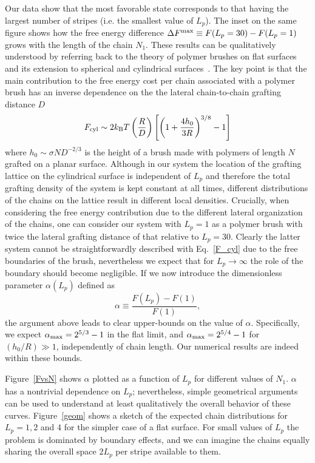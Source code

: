  Our data show that the most favorable state corresponds to that having the largest number of stripes (i.e. the smallest value of $L_p$). The inset on the same figure shows how the free energy difference $\Delta F^{\rm max}\equiv F(L_p=30)-F(L_p=1)$ grows with the length of the chain $N_1$.
 These results can be qualitatively understood by referring back to the theory of polymer brushes on flat surfaces and its extension to spherical and cylindrical  
surfaces~\cite{Cotton,LipowskyPB}. The key point is that the main contribution to the free energy cost per chain associated with a polymer brush has an inverse dependence on the the lateral chain-to-chain grafting distance $D$ 
\begin{equation}
F_{\rm cyl}\sim 2 k_{\rm B}T \left (\frac{R}{D}\right )\left [\left (1+\frac{4h_0}{3R}\right )^{3/8}-1\right ]
\label{F_cyl}
\end{equation} 
where $h_0\sim \sigma N D^{-2/3}$ is the height of a brush made with polymers of length $N$ grafted on a planar surface. Although in our system the location of the grafting lattice on the cylindrical surface 
is independent of $L_p$ and  therefore the total grafting density of the system is kept constant at all times, 
different distributions of the chains on the lattice result in different local densities. 
Crucially, when considering the free energy contribution due to the different lateral organization of the chains, one can consider our system with $L_p=1$ as a polymer brush with twice the lateral grafting distance of that relative to $L_p=30$. Clearly the latter system cannot be straightforwardly described with Eq.~\ref{F_cyl} due to the free boundaries of the brush, nevertheless we expect that for $L_p\rightarrow\infty$ 
the role of the boundary should become negligible. If we now introduce the dimensionless parameter
$\alpha (L_p)$ defined as
\begin{equation}
\alpha\equiv\frac{F(L_p)-F(1)}{F(1)},
\end{equation}
the argument above leads to clear  upper-bounds on the value of $\alpha$.
Specifically, we expect $\alpha_{\rm max}=2^{5/3}-1$ in the flat limit, and $\alpha_{\rm max}=2^{5/4}-1$ for $(h_0/R)\gg1$,  independently of chain length. Our numerical results are indeed within these bounds.
 
Figure~\ref{FvsN} shows $\alpha$ plotted as a function of $L_p$ for different values of $N_1$.
$\alpha$ has a nontrivial dependence on $L_p$; nevertheless, 
simple geometrical arguments can be used to understand at least qualitatively the overall
behavior of these curves. Figure~\ref{geom} shows a sketch of the expected chain distributions 
for $L_p=1,2$ and $4$ for the simpler case of a flat surface.
For small values of $L_p$ the problem is dominated by boundary effects, and we can imagine 
the chains equally sharing the overall space $2L_p$ per stripe available to them.

